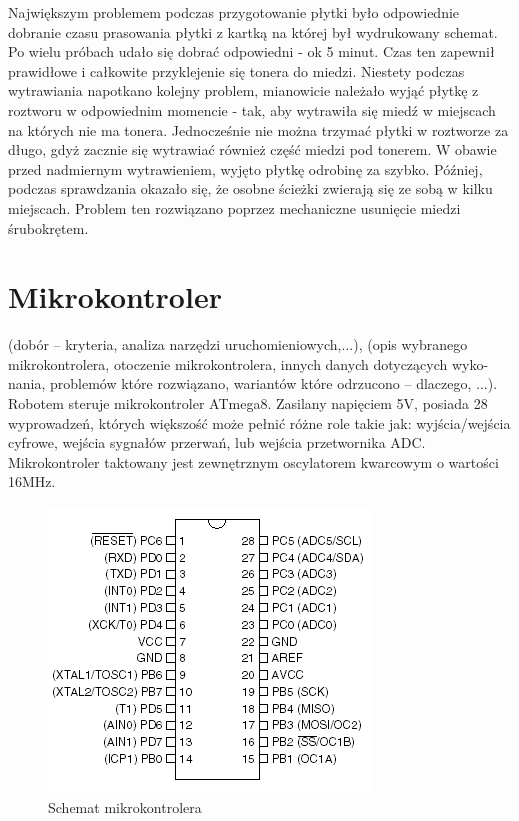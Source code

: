\documentclass[11pt,a4paper]{article}
\begin{document}
Największym problemem podczas przygotowanie płytki było odpowiednie dobranie czasu prasowania płytki z kartką na której był wydrukowany schemat. 
Po wielu próbach udało się dobrać odpowiedni - ok 5 minut. Czas ten zapewnił prawidłowe i całkowite przyklejenie się tonera do miedzi. 
Niestety podczas wytrawiania napotkano kolejny problem, mianowicie należało wyjąć płytkę z roztworu w odpowiednim momencie - tak, aby wytrawiła się miedź w miejscach na których nie ma tonera. Jednocześnie nie można trzymać płytki w roztworze za długo, gdyż zacznie się wytrawiać również część miedzi pod tonerem. W obawie przed nadmiernym wytrawieniem, wyjęto płytkę odrobinę za szybko. Później, podczas sprawdzania okazało się, że osobne ścieżki zwierają się ze sobą w kilku miejscach. Problem ten rozwiązano poprzez mechaniczne usunięcie miedzi śrubokrętem.

\section{Mikrokontroler}
(dobór – kryteria, analiza narzędzi uruchomieniowych,...), (opis
wybranego mikrokontrolera, otoczenie mikrokontrolera, innych danych dotyczących wyko-
nania, problemów które rozwiązano, wariantów które odrzucono – dlaczego, ...).
  Robotem steruje mikrokontroler ATmega8. Zasilany napięciem 5V, posiada 28 wyprowadzeń, których większość może pełnić różne role takie jak: wyjścia/wejścia cyfrowe, wejścia sygnałów przerwań, lub wejścia przetwornika ADC.
  Mikrokontroler taktowany jest zewnętrznym oscylatorem kwarcowym o wartości 16MHz.
  
   
\begin{figure}[H]
  \includegraphics[scale=1]{atmega8}
  \caption{Schemat mikrokontrolera}
\end{figure}
\end{document}
